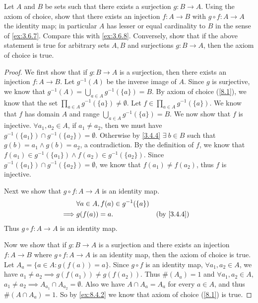 \begin{ex}\label{ex:8.4.3}
  Let \(A\) and \(B\) be sets such that there exists a surjection \(g : B \to A\).
  Using the axiom of choice, show that there exists an injection \(f: A \to B\) with \(g \circ f : A \to A\) the identity map;
  in particular \(A\) has lesser or equal cardinality to \(B\) in the sense of \cref{ex:3.6.7}.
  Compare this with \cref{ex:3.6.8}.
  Conversely, show that if the above statement is true for arbitrary sets \(A, B\) and surjections \(g : B \to A\), then the axiom of choice is true.
\end{ex}

\begin{proof}
  We first show that if \(g : B \to A\) is a surjection, then there exists an injection \(f : A \to B\).
  Let \(g^{-1}(A)\) be the inverse image of \(A\).
  Since \(g\) is surjective, we know that \(g^{-1}(A) = \bigcup_{a \in A} g^{-1}(\{a\}) = B\).
  By axiom of choice (\cref{8.1}), we know that the set \(\prod_{a \in A} g^{-1}(\{a\}) \neq \emptyset\).
  Let \(f \in \prod_{a \in A} g^{-1}(\{a\})\).
  We know that \(f\) has domain \(A\) and range \(\bigcup_{a \in A} g^{-1}(\{a\}) = B\).
  We now show that \(f\) is injective.
  \(\forall a_1, a_2 \in A\), if \(a_1 \neq a_2\), then we must have \(g^{-1}(\{a_1\}) \cap g^{-1}(\{a_2\}) = \emptyset\).
  Otherwise by \cref{3.4.4} \(\exists\ b \in B\) such that \(g(b) = a_1 \land g(b) = a_2\), a contradiction.
  By the definition of \(f\), we know that \(f(a_1) \in g^{-1}(\{a_1\}) \land f(a_2) \in g^{-1}(\{a_2\})\).
  Since \(g^{-1}(\{a_1\}) \cap g^{-1}(\{a_2\}) = \emptyset\), we know that \(f(a_1) \neq f(a_2)\), thus \(f\) is injective.

  Next we show that \(g \circ f : A \to A\) is an identity map.
  \begin{align*}
             & \forall a \in A, f(a) \in g^{-1}(\{a\})                               \\
    \implies & g(f(a)) = a.                            &  & \text{(by \cref{3.4.4})}
  \end{align*}
  Thus \(g \circ f : A \to A\) is an identity map.

  Now we show that if \(g : B \to A\) is a surjection and there exists an injection \(f : A \to B\) where \(g \circ f : A \to A\) is an identity map, then the axiom of choice is true.
  Let \(A_a = \{a \in A : g(f(a)) = a\}\).
  Since \(g \circ f\) is an identity map, \(\forall a_1, a_2 \in A\), we have \(a_1 \neq a_2 \implies g(f(a_1)) \neq g(f(a_2))\).
  Thus \(\#(A_a) = 1\) and \(\forall a_1, a_2 \in A\), \(a_1 \neq a_2 \implies A_{a_1} \cap A_{a_2} = \emptyset\).
  Also we have \(A \cap A_a = A_a\) for every \(a \in A\), and thus \(\#(A \cap A_a) = 1\).
  So by \cref{ex:8.4.2} we know that axiom of choice (\cref{8.1}) is true.
\end{proof}
